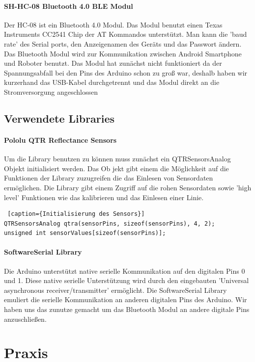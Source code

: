\documentclass[12pt]{article}
\begin{document}
\paragraph{SH-HC-08 Bluetooth 4.0 BLE Modul} Der HC-08 ist ein Bluetooth 4.0 Modul. Das Modul benutzt einen Texas Instruments CC2541 Chip der AT Kommandos unterstützt. Man kann die 'baud rate' des Serial ports, den Anzeigenamen des Geräts und das Passwort ändern. Das Bluetooth Modul wird zur Kommunikation zwischen Android Smartphone und Roboter benutzt. Das Modul hat zunächst nicht funktioniert da der Spannungsabfall bei den Pins des Arduino schon zu groß war, deshalb haben wir kurzerhand das USB-Kabel durchgetrennt und das Modul direkt an die Stromversorgung angeschlossen
\subsection{Verwendete Libraries}
\paragraph{Pololu QTR Reflectance Sensors}
\cite{QTR}
Um die Library benutzen zu können muss zunächst ein QTRSensorsAnalog Objekt initialisiert werden. Das Ob jekt gibt einem die Möglichkeit auf die Funktionen der Library zuzugreifen die das Einlesen von Sensordaten ermöglichen. Die Library gibt einem Zugriff auf die rohen Sensordaten sowie 'high level' Funktionen wie das kalibrieren und das Einlesen einer Linie. 

\begin{lstlisting} [caption={Initialisierung des Sensors}] 
QTRSensorsAnalog qtra(sensorPins, sizeof(sensorPins), 4, 2);
unsigned int sensorValues[sizeof(sensorPins)];
\end{lstlisting}

\paragraph{SoftwareSerial Library} \cite{SoftwareSerial}
Die Arduino unterstützt native serielle Kommunikation auf den digitalen Pins 0 und 1. Diese native serielle Unterstützung wird durch den eingebauten 'Universal asynchronous receiver/transmitter' ermöglicht. Die SoftwareSerial Library emuliert die serielle Kommunikation an anderen digitalen Pins des Arduino. Wir haben uns das zunutze gemacht um das Bluetooth Modul an andere digitale Pins anzuschließen. 

\section{Praxis}
\end{document}
